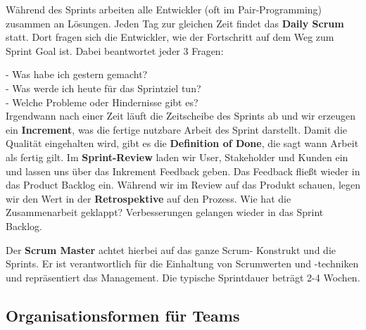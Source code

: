 \documentclass{article}
\begin{document}
\begin{enumerate}[label=\alph*)]
Während des Sprints arbeiten alle Entwickler (oft im Pair-Programming) zusammen an Lösungen. Jeden Tag zur gleichen Zeit findet das \textbf{Daily Scrum} statt. Dort fragen sich die Entwickler, wie der Fortschritt auf dem Weg zum Sprint Goal ist. Dabei beantwortet jeder 3 Fragen:

- Was habe ich gestern gemacht?\\
- Was werde ich heute für das Sprintziel tun?\\
- Welche Probleme oder Hindernisse gibt es?\\

Irgendwann nach einer Zeit läuft die Zeitscheibe des Sprints ab und wir erzeugen ein \textbf{Increment}, was die fertige nutzbare Arbeit des Sprint darstellt. Damit die Qualität eingehalten wird, gibt es die \textbf{Definition of Done}, die sagt wann Arbeit als fertig gilt. Im \textbf{Sprint-Review} laden wir User, Stakeholder und Kunden ein und lassen uns über das Inkrement Feedback geben. Das Feedback fließt wieder in das Product Backlog ein. Während wir im Review auf das Produkt schauen, legen wir den Wert in der \textbf{Retrospektive} auf den Prozess. Wie hat die Zusammenarbeit geklappt? Verbesserungen gelangen wieder in das Sprint Backlog.

Der \textbf{Scrum Master} achtet hierbei auf das ganze Scrum- Konstrukt und die Sprints. Er ist verantwortlich für die Einhaltung von Scrumwerten und -techniken und repräsentiert das Management. Die typische Sprintdauer beträgt 2-4 Wochen.
  \end{enumerate}
  
  \newpage
  \subsection*{Organisationsformen für Teams}
	
\end{document}
